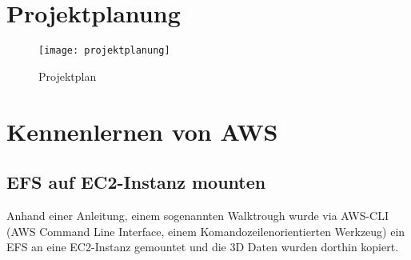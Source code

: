 \section{Projektplanung}
\begin{figure}[H]
	\centering
	\texttt{[image: projektplanung]}
	\caption{Projektplan}
	\label{fig:Projektplan}
\end{figure}

\section{Kennenlernen von AWS}

\subsection{EFS auf EC2-Instanz mounten}
Anhand einer Anleitung, einem sogenannten Walktrough wurde via AWS-CLI (AWS Command Line Interface, einem Komandozeilenorientierten Werkzeug) ein
EFS an eine EC2-Instanz gemountet und die 3D Daten wurden dorthin kopiert.
